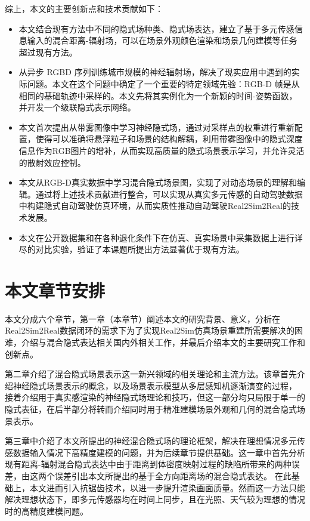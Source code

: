 综上，本文的主要创新点和技术贡献如下：
\begin{itemize}
    \item 本文结合现有方法中不同的隐式场种类、隐式场表达，建立了基于多元传感信息输入的混合距离-辐射场，可以在场景外观颜色渲染和场景几何建模等任务超过现有方法。
    \item 从异步 RGBD 序列训练城市规模的神经辐射场，解决了现实应用中遇到的实际问题。本文在这个问题中确定了一个重要的特定领域先验：RGB-D 帧是从相同的基础轨迹中采样的。本文先将其实例化为一个新颖的时间-姿势函数，并开发一个级联隐式表示网络。
    \item 本文首次提出从带雾图像中学习神经隐式场，通过对采样点的权重进行重新配置，使得可以准确将悬浮粒子和场景的结构解耦，利用带雾图像中的隐式深度信息作为RGB图片的增补，从而实现高质量的隐式场景表示学习，并允许灵活的散射效应控制。
    \item 本文从RGB-D真实数据中学习混合隐式场景图，实现了对动态场景的理解和编辑。通过将上述技术贡献进行整合，可以实现从真实多元传感的自动驾驶数据中构建隐式自动驾驶仿真环境，从而实质性推动自动驾驶Real2Sim2Real的技术发展。
    \item 本文在公开数据集和在各种退化条件下在仿真、真实场景中采集数据上进行详尽的对比实验，验证了本课题所提出方法显著优于现有方法。
\end{itemize}

\section{本文章节安排}
本文分成六个章节，第一章（本章节）阐述本文的研究背景、意义，分析在Real2Sim2Real数据闭环的需求下为了实现Real2Sim仿真场景重建所需要解决的困难，介绍与混合隐式表达相关国内外相关工作，并最后介绍本文的主要研究工作和创新点。

第二章介绍了混合隐式场景表示这一新兴领域的相关理论和主流方法。该章首先介绍神经隐式场景表示的概念，以及场景表示模型从多层感知机逐渐演变的过程， 接着介绍用于真实感渲染的神经隐式场理论和技巧，但这一部分均只局限于单一的隐式表征，在后半部分将转而介绍同时用于精准建模场景外观和几何的混合隐式场景表示。

第三章中介绍了本文所提出的神经混合隐式场的理论框架，解决在理想情况多元传感数据输入情况下高精度建模的问题，并为后续章节提供基础。这一章中首先分析现有距离-辐射混合隐式表达中由于距离到体密度映射过程的缺陷所带来的两种误差，由这两个误差引出本文所提出的基于全方向距离场的混合隐式表达。 在此基础上，本文进而引入抗锯齿技术，以进一步提升渲染画面质量。然而这一方法只能解决理想状态下，即多元传感器均在时间上同步，且在光照、天气较为理想的情况时的高精度建模问题。

